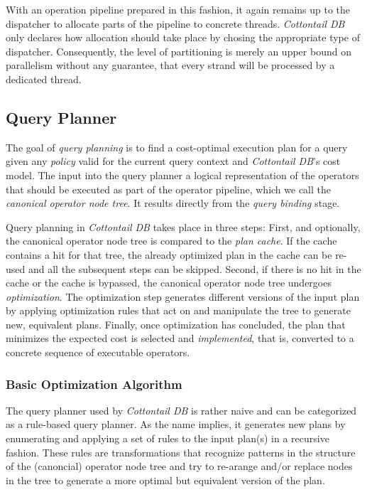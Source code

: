 With an operation pipeline prepared in this fashion, it again remains up to the dispatcher to allocate parts of the pipeline to concrete threads. \emph{Cottontail DB} only declares how allocation should take place by chosing the appropriate type of dispatcher. Consequently, the level of partitioning is merely an upper bound on parallelism without any guarantee, that every strand will be processed by a dedicated thread. 

\subsection{Query Planner}

The goal of \emph{query planning} is to find a cost-optimal execution plan for a query given any \emph{policy} valid for the current query context and \emph{Cottontail DB}'s cost model. The input into the query planner a logical representation of the operators that should be executed as part of the operator pipeline, which we call the \emph{canonical operator node tree}. It results directly from the \emph{query binding} stage.

Query planning in \emph{Cottontail DB} takes place in three steps: First, and optionally, the canonical operator node tree is compared to the \emph{plan cache}. If the cache contains a hit for that tree, the already optimized plan in the cache can be re-used and all the subsequent steps can be skipped. Second, if there is no hit in the cache or the cache is bypassed, the canonical operator node tree undergoes \emph{optimization}. The optimization step generates different versions of the input plan by applying optimization rules that act on and manipulate the tree to generate new, equivalent plans. Finally, once optimization has concluded, the plan that minimizes the expected cost is selected and \emph{implemented}, that is, converted to a concrete sequence of executable operators.

\subsubsection{Basic Optimization Algorithm}

The query planner used by \emph{Cottontail DB} is rather naive and can be categorized as a rule-based query planner. As the name implies, it generates new plans by enumerating and applying a set of rules to the input plan(s) in a recursive fashion. These rules are transformations that recognize patterns in the structure of the (canoncial) operator node tree and try to re-arange and/or replace nodes in the tree to generate a more optimal but equivalent version of the plan.

